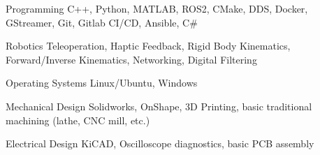 

\begin{cvskills}

    \cvskill
      {Programming} %
      {C++, Python, MATLAB, ROS2, CMake, DDS, Docker, GStreamer, Git, Gitlab CI/CD, Ansible, C\#}

    \cvskill
      {Robotics}
      {Teleoperation, Haptic Feedback, Rigid Body Kinematics, Forward/Inverse Kinematics, Networking, Digital Filtering}

    \cvskill
      {Operating Systems} %
      {Linux/Ubuntu, Windows} %

    \cvskill
      {Mechanical Design} %
      {Solidworks, OnShape, 3D Printing, basic traditional machining (lathe, CNC mill, etc.)} %

    \cvskill
      {Electrical Design}
      {KiCAD, Oscilloscope diagnostics, basic PCB assembly}

\end{cvskills}
